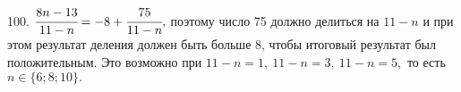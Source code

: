 100. $\cfrac{8n-13}{11-n}=-8+\cfrac{75}{11-n},$ поэтому число 75 должно делиться на $11-n$ и при этом результат деления должен быть больше 8, чтобы итоговый результат был положительным. Это возможно при $11-n=1,\ 11-n=3,\ 11-n=5,$ то есть $n\in\{6;8;10\}.$\\
